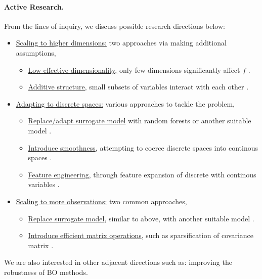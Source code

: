 \documentclass[
    american,a4paper
    ]{scrartcl}
\begin{document}
        \paragraph{Active Research.}
        From the lines of inquiry, we discuss possible research directions below:
        \begin{itemize}
            \item \underline{Scaling to higher dimensions:} two approaches via making additional assumptions,
            \begin{itemize}
                \item \underline{Low effective dimensionality,} only few dimensions significantly affect $f$ \cite{chen2012joint}.
                \item \underline{Additive structure,} small subsets of variables interact with each other \cite{kandasamy2015high}.
            \end{itemize}
            \item \underline{Adapting to discrete spaces:} various approaches to tackle the problem,
            \begin{itemize}
                \item \underline{Replace/adapt surrogate model} with random forests or another suitable model \cite{hutter2013evaluation}.
                \item \underline{Introduce smoothness}, attempting to coerce discrete spaces into continous spaces \cite{oh2019combinatorial}.
                \item \underline{Feature engineering}, through feature expansion of discrete with continous variables \cite{daxberger2019mixed}.
            \end{itemize}
            \item \underline{Scaling to more observations:} two common approaches,
            \begin{itemize}
                \item \underline{Replace surrogate model}, similar to above, with another suitable model \cite{hutter2011sequential}.
                \item \underline{Introduce efficient matrix operations}, such as sparsification of covariance matrix \cite{seeger2003fast}.
            \end{itemize}
        \end{itemize}
        We are also interested in other adjacent directions such as: improving the robustness of BO methods.
        
\end{document}
